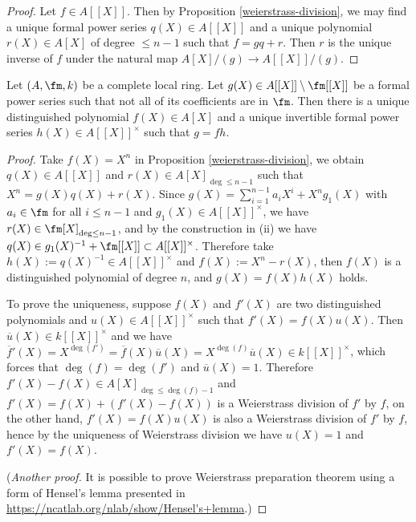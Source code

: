 \begin{proof}
\leanok
Let $f\in A[[X]]$.
Then by Proposition \ref{weierstrass-division},
we may find a unique formal power series
$q(X)\in A[[X]]$ and a unique polynomial $r(X)\in A[X]$ of degree $\leq n-1$
such that $f=gq+r$.
Then $r$ is the unique inverse of $f$ under the natural map $A[X]/(g)\to A[[X]]/(g)$.
\end{proof}

\begin{prop}
\label{weierstrass-preparation}
\leanok
Let $(A,\fm,k)$ be a complete local ring.
Let $g(X)\in A[[X]]\setminus\fm[[X]]$ be a formal power series
such that not all of its coefficients are in $\fm$.
Then there is a unique distinguished polynomial $f(X)\in A[X]$
and a unique invertible formal power series $h(X)\in A[[X]]^\times$ such that $g=fh$.
\end{prop}

\begin{proof}
\leanok
Take $f(X)=X^n$ in Proposition \ref{weierstrass-division}, we obtain $q(X)\in A[[X]]$
and $r(X)\in A[X]_{\deg\leq n-1}$ such that $X^n=g(X)q(X)+r(X)$.
Since $g(X)=\sum_{i=1}^{n-1}a_iX^i+X^ng_1(X)$
with $a_i\in\fm$ for all $i\leq n-1$ and $g_1(X)\in A[[X]]^\times$,
we have $r(X)\in\fm[X]_{\deg\leq n-1}$, and by the construction in (ii)
we have $q(X)\in g_1(X)^{-1}+\fm[[X]]\subset A[[X]]^\times$.
Therefore take $h(X):=q(X)^{-1}\in A[[X]]^\times$
and $f(X):=X^n-r(X)$, then $f(X)$ is a distinguished polynomial of degree $n$,
and $g(X)=f(X)h(X)$ holds.

To prove the uniqueness, suppose $f(X)$ and $f'(X)$ are two distinguished polynomials
and $u(X)\in A[[X]]^\times$ such that $f'(X)=f(X)u(X)$.
Then $\overline u(X)\in k[[X]]^\times$ and we have
$\overline f{}'(X)=X^{\deg(f')}=\overline f(X)\overline u(X)
=X^{\deg(f)}\overline u(X)\in k[[X]]^\times$,
which forces that $\deg(f)=\deg(f')$ and $\overline u(X)=1$.
Therefore $f'(X)-f(X)\in A[X]_{\deg\leq\deg(f)-1}$
and $f'(X)=f(X)+(f'(X)-f(X))$ is a Weierstrass division of $f'$ by $f$,
on the other hand, $f'(X)=f(X)u(X)$ is also a Weierstrass division of $f'$ by $f$,
hence by the uniqueness of Weierstrass division
we have $u(X)=1$ and $f'(X)=f(X)$.

(\emph{Another proof.}
It is possible to prove Weierstrass preparation theorem using a form
of Hensel's lemma presented in \url{https://ncatlab.org/nlab/show/Hensel's+lemma}.)
\end{proof}

